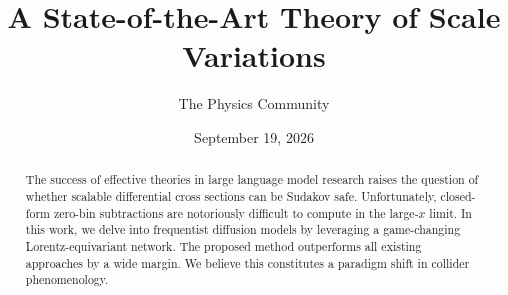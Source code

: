 \documentclass[11pt]{article}
\title{A State-of-the-Art Theory of Scale Variations}
\author{The Physics Community}
\date{September 19, 2026}
\begin{document}
\maketitle
\begin{abstract}
The success of effective theories in large language model research
raises the question of whether scalable differential cross sections can
be Sudakov safe. Unfortunately, closed-form zero-bin subtractions are
notoriously difficult to compute in the large-$x$ limit. In this work,
we delve into frequentist diffusion models by leveraging a game-changing
Lorentz-equivariant network. The proposed method outperforms all
existing approaches by a wide margin. We believe this constitutes a
paradigm shift in collider phenomenology.
\end{abstract}
\tableofcontents



\nocite{*}


\end{document}
